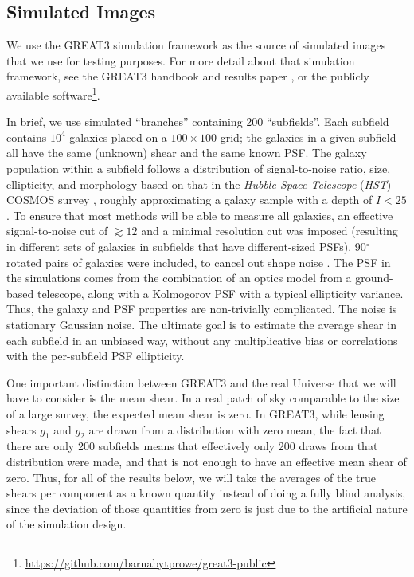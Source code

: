 \documentclass[iop]{emulateapj}
\begin{document}
\subsection{Simulated Images}

We use the GREAT3 simulation framework as the source of simulated images that we use for testing
purposes.  For more detail about that simulation framework, see the GREAT3 handbook
\citep{2014ApJS..212....5M} and results paper \citep{2015MNRAS.450.2963M}, or the publicly
available software\footnote{\url{https://github.com/barnabytprowe/great3-public}}.

In brief, we use simulated ``branches'' containing 200 ``subfields''.  Each subfield contains $10^4$
galaxies placed on a $100\times 100$ grid; the galaxies in a given subfield all have the same
(unknown) shear and the same known PSF.  The galaxy population within a subfield follows a
distribution of signal-to-noise ratio, size, ellipticity, and morphology based on that in the {\it
  Hubble Space Telescope} ({\it HST}) COSMOS survey
\citep{2007ApJS..172..196K,2007ApJS..172....1S,2007ApJS..172...38S}, roughly approximating a galaxy
sample with a depth of $I<25$.  To ensure that most methods will be able to measure all galaxies, an
effective signal-to-noise cut of $\gtrsim 12$ and a minimal resolution cut was imposed (resulting in
different sets of galaxies in subfields that have different-sized PSFs).  90$^\circ$ rotated pairs
of galaxies were included, to cancel out shape noise \citep{2007MNRAS.376...13M}.  The PSF in the
simulations comes from the combination of an optics model from a ground-based telescope, along with
a Kolmogorov PSF with a typical ellipticity variance.  Thus, the galaxy and PSF properties are
non-trivially complicated.  The noise is stationary Gaussian noise.  The
ultimate goal is to estimate the average shear in each subfield in an unbiased way, without any
multiplicative bias or correlations with the per-subfield PSF ellipticity.

One important distinction between GREAT3 and the real Universe that we will have to consider is the
mean shear.  In a real patch of sky comparable to the size of a large survey, the expected mean
shear is zero.  In GREAT3, while lensing shears $g_1$ and $g_2$ are drawn from a distribution with
zero mean, the fact that there are only 200 subfields means that effectively only 200 draws from
that distribution were made, and that is not enough to have an effective mean shear of zero.  Thus,
for all of the results below, we will take the averages of the true shears per component as a known
quantity instead of doing a fully blind analysis, since the deviation of those quantities from zero
is just due to the artificial nature of the simulation design.
\end{document}
